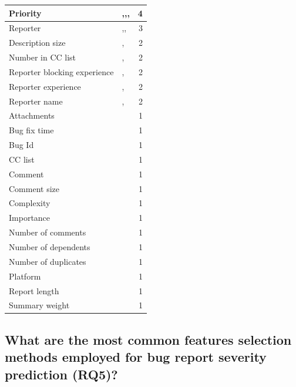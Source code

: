 \begin{table}[h!]
\begin{tabular}{@{}lp{10cm}r@{}}
    \midrule
    Priority & \cite{Yang:2014b},\cite{Valdivia:2014},\cite{Meera:2014},\cite{Xia:2015} & 4 \\
    \midrule
    Reporter & \cite{Jin:2016a},\cite{Jin:2016b},\cite{Jin:2016c} & 3 \\
    \midrule
    Description size & \cite{Valdivia:2014},\cite{Xia:2015} & 2 \\
    \midrule
    Number in CC list & \cite{Valdivia:2014},\cite{Xia:2015} & 2 \\
    \midrule
    Reporter blocking experience & \cite{Valdivia:2014},\cite{Xia:2015} & 2 \\
    \midrule
    Reporter experience & \cite{Valdivia:2014},\cite{Xia:2015} & 2 \\
    \midrule
    Reporter name & \cite{Valdivia:2014},\cite{Xia:2015} & 2 \\
    \midrule
    Attachments & \cite{Yang:2014a} & 1 \\
    \midrule
    Bug fix time & \cite{Meera:2014} & 1 \\
    \midrule
    Bug Id & \cite{Choeikiwong:2016} & 1 \\
    \midrule
    CC list & \cite{Meera:2014} & 1 \\
    \midrule
    Comment & \cite{Valdivia:2014} & 1 \\
    \midrule
    Comment size & \cite{Xia:2015} & 1 \\
    \midrule
    Complexity & \cite{Meera:2014} & 1 \\
    \midrule
    Importance & \cite{Pushpalathas:2016} & 1 \\
    \midrule
    Number of comments & \cite{Meera:2014} & 1 \\
    \midrule
    Number of dependents & \cite{Meera:2014} & 1 \\
    \midrule
    Number of duplicates & \cite{Meera:2014} & 1 \\
    \midrule
    Platform & \cite{Xia:2015} & 1 \\
    \midrule
    Report length & \cite{Yang:2014a} & 1 \\
    \midrule
    Summary weight & \cite{Meera:2014} & 1 \\
    \bottomrule
  \end{tabular}
  \label{tab:features_by_papers}
\end{table}


\subsection{What are the most common features selection methods employed for bug report severity prediction (RQ5)?}\label{subsec:rq5_result} 

